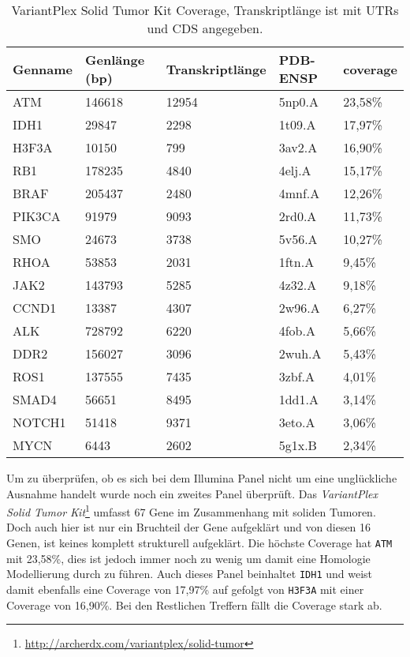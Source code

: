 \begin{table}[]
    \centering
    \begin{tabular}{lllll}
    \hline
    \multicolumn{1}{|l|}{Genname} & \multicolumn{1}{l|}{Genlänge (bp)} & \multicolumn{1}{l|}{Transkriptlänge} & \multicolumn{1}{l|}{PDB-ENSP} & \multicolumn{1}{l|}{coverage} \\ \hline
    ATM & 146618 & 12954 & 5np0.A & 23,58\% \\
    IDH1 & 29847 & 2298 & 1t09.A & 17,97\% \\
    H3F3A & 10150 & 799 & 3av2.A & 16,90\% \\
    RB1 & 178235 & 4840 & 4elj.A & 15,17\% \\
    BRAF & 205437 & 2480 & 4mnf.A & 12,26\% \\
    PIK3CA & 91979 & 9093 & 2rd0.A & 11,73\% \\
    SMO & 24673 & 3738 & 5v56.A & 10,27\% \\
    RHOA & 53853 & 2031 & 1ftn.A & 9,45\% \\
    JAK2 & 143793 & 5285 & 4z32.A & 9,18\% \\
    CCND1 & 13387 & 4307 & 2w96.A & 6,27\% \\
    ALK & 728792 & 6220 & 4fob.A & 5,66\% \\
    DDR2 & 156027 & 3096 & 2wuh.A & 5,43\% \\
    ROS1 & 137555 & 7435 & 3zbf.A & 4,01\% \\
    SMAD4 & 56651 & 8495 & 1dd1.A & 3,14\% \\
    NOTCH1 & 51418 & 9371 & 3eto.A & 3,06\% \\
    MYCN & 6443 & 2602 & 5g1x.B & 2,34\%
    \end{tabular}
    \caption{VariantPlex Solid Tumor Kit Coverage, Transkriptlänge ist mit UTRs und CDS angegeben.}
    \label{tab:variantplex_coverage}
\end{table}

Um zu überprüfen, ob es sich bei dem Illumina Panel nicht um eine unglückliche Ausnahme handelt wurde noch ein zweites Panel überprüft. Das \emph{VariantPlex Solid Tumor Kit}\footnote{\url{http://archerdx.com/variantplex/solid-tumor}} umfasst 67 Gene im Zusammenhang mit soliden Tumoren. Doch auch hier ist nur ein Bruchteil der Gene aufgeklärt und von diesen 16 Genen, ist keines komplett strukturell aufgeklärt. Die höchste Coverage hat \texttt{ATM} mit 23,58\%, dies ist jedoch immer noch zu wenig um damit eine Homologie Modellierung durch zu führen. Auch dieses Panel beinhaltet \texttt{IDH1} und weist damit ebenfalls eine Coverage von 17,97\% auf gefolgt von \texttt{H3F3A} mit einer Coverage von 16,90\%. Bei den Restlichen Treffern fällt die Coverage stark ab.

